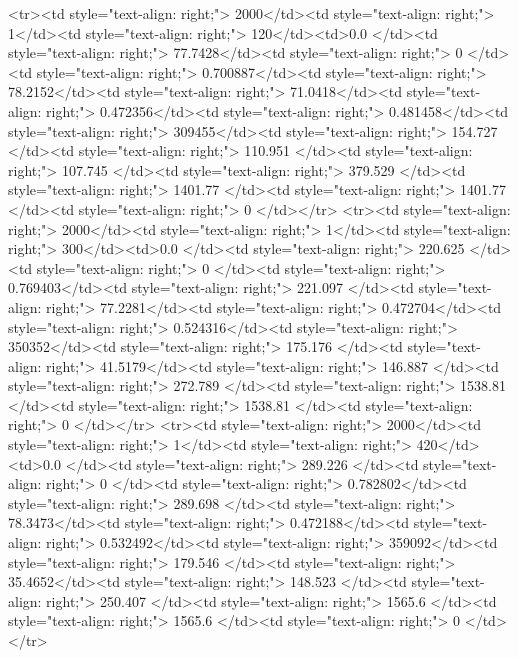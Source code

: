 <tr><td style="text-align: right;">      2000</td><td style="text-align: right;">         1</td><td style="text-align: right;">           120</td><td>0.0          </td><td style="text-align: right;">                77.7428</td><td style="text-align: right;">           0       </td><td style="text-align: right;">         0.700887</td><td style="text-align: right;">         78.2152</td><td style="text-align: right;">            71.0418</td><td style="text-align: right;">               0.472356</td><td style="text-align: right;">             0.481458</td><td style="text-align: right;">              309455</td><td style="text-align: right;">                      154.727 </td><td style="text-align: right;">           110.951 </td><td style="text-align: right;">               107.745  </td><td style="text-align: right;">       379.529 </td><td style="text-align: right;">   1401.77 </td><td style="text-align: right;">      1401.77 </td><td style="text-align: right;">                  0     </td></tr>
<tr><td style="text-align: right;">      2000</td><td style="text-align: right;">         1</td><td style="text-align: right;">           300</td><td>0.0          </td><td style="text-align: right;">               220.625 </td><td style="text-align: right;">           0       </td><td style="text-align: right;">         0.769403</td><td style="text-align: right;">        221.097 </td><td style="text-align: right;">            77.2281</td><td style="text-align: right;">               0.472704</td><td style="text-align: right;">             0.524316</td><td style="text-align: right;">              350352</td><td style="text-align: right;">                      175.176 </td><td style="text-align: right;">            41.5179</td><td style="text-align: right;">               146.887  </td><td style="text-align: right;">       272.789 </td><td style="text-align: right;">   1538.81 </td><td style="text-align: right;">      1538.81 </td><td style="text-align: right;">                  0     </td></tr>
<tr><td style="text-align: right;">      2000</td><td style="text-align: right;">         1</td><td style="text-align: right;">           420</td><td>0.0          </td><td style="text-align: right;">               289.226 </td><td style="text-align: right;">           0       </td><td style="text-align: right;">         0.782802</td><td style="text-align: right;">        289.698 </td><td style="text-align: right;">            78.3473</td><td style="text-align: right;">               0.472188</td><td style="text-align: right;">             0.532492</td><td style="text-align: right;">              359092</td><td style="text-align: right;">                      179.546 </td><td style="text-align: right;">            35.4652</td><td style="text-align: right;">               148.523  </td><td style="text-align: right;">       250.407 </td><td style="text-align: right;">   1565.6  </td><td style="text-align: right;">      1565.6  </td><td style="text-align: right;">                  0     </td></tr>
